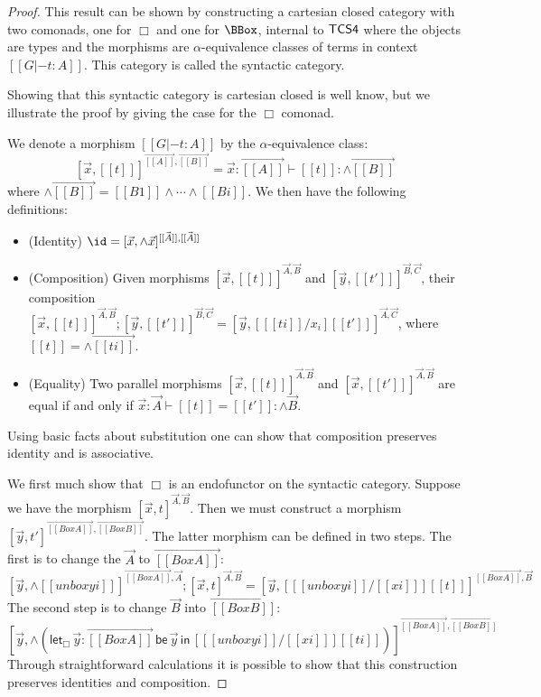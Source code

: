 \begin{proof}
  This result can be shown by constructing a cartesian closed category
  with two comonads, one for $\Box$ and one for $\BBox$, internal to
  $\sf{TCS4}$ where the objects are types and the morphisms are
  $\alpha$-equivalence classes of terms in context $[[G |- t : A]]$.
  This category is called the syntactic category.

  Showing that this syntactic category is cartesian closed is well
  know, but we illustrate the proof by giving the case for the $\Box$
  comonad.

  We denote a morphism $[[G |- t : A]]$ by the $\alpha$-equivalence
  class:
  \[
  [\vec{x},[[t]] ]^{\vec{[[A]]},\vec{[[B]]}} = \vec{x}:\vec{[[A]]} \vdash [[t]] : \wedge\vec{[[B]]}
  \]
  where $\wedge\vec{[[B]]} = [[B1]] \wedge \cdots \wedge [[Bi]]$.  We
  then have the following definitions:
  \begin{itemize}
  \item (Identity) $\id = [\vec{x},\wedge\vec{x}]^{\vec{[[A]]},\vec{[[A]]}}$
  \item (Composition) Given morphisms $[\vec{x},[[t]] ]^{\vec{A},\vec{B}}$ and
    $[\vec{y},[[t']] ]^{\vec{B},\vec{C}}$, their composition
    $[\vec{x},[[t]] ]^{\vec{A},\vec{B}};[\vec{y},[[t']] ]^{\vec{B},\vec{C}} =
    [\vec{y},[ [[ti]] / x_i ] [[t']] ]^{\vec{A},\vec{C}}$, where
    $[[t]] = \wedge\vec{[[ti]]}$.
  \item (Equality) Two parallel morphisms $[\vec{x},[[t]]
  ]^{\vec{A},\vec{B}}$ and $[\vec{x},[[t']] ]^{\vec{A},\vec{B}}$ are
    equal if and only if
    $\vec{x} : \vec{A} \vdash [[t]] = [[t']] : \wedge\vec{B}$.
  \end{itemize}
  Using basic facts about substitution one can show that composition
  preserves identity and is associative.

  We first much show that $\Box$ is an endofunctor on the syntactic
  category.  Suppose we have the morphism
  $[\vec{x},t]^{\vec{A},\vec{B}}$.  Then we must construct a morphism
  $[\vec{y},t']^{\overrightarrow{[[Box A]]},\overrightarrow{[[Box
          B]]}}$.  The latter morphism can be defined in two steps.
  The first is to change the $\vec{A}$ to $\overrightarrow{[[Box A]]}$:
  \[
    [ \vec{y},\wedge [[unbox yi]] ]^{\overrightarrow{[[Box A]]},\vec{A}};[\vec{x},t]^{\vec{A},\vec{B}}
    = [\vec{y}, [ [[unbox yi]]/[[xi]] ] [[t]] ]^{\overrightarrow{[[Box A]]},\vec{B}}
    \]
    The second step is to change $\vec{B}$ into $\overrightarrow{[[Box
          B]]}$:
    \[
      [\vec{y},\wedge (\mathsf{let}_\Box\,\vec{y}:\overrightarrow{[[Box A]]}\,\mathsf{be}\,\vec{y}\,\mathsf{in}\,[ [[unbox yi]]/[[xi]] ][[ti]])]^{\overrightarrow{[[Box A]]},\overrightarrow{[[Box B]]}}
      \]
  Through straightforward calculations it is possible to show that
  this construction preserves identities and composition.


\end{proof}
